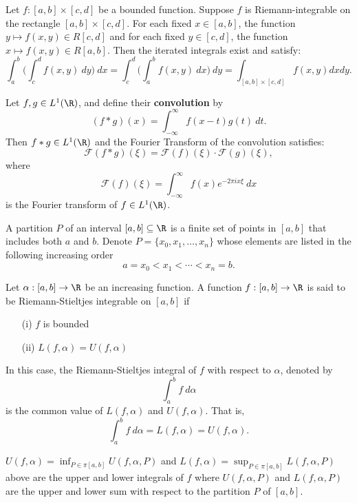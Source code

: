 \begin{theorem}\label{Fubini's Theorem}
    Let \( f: [a,b] \times [c,d]  \) be a bounded function. Suppose \( f  \) is Riemann-integrable on the rectangle \( [a,b] \times [c,d] \). For each fixed \( x \in [a,b]  \), the function \( y \mapsto f(x,y) \in R[c,d] \) and for each fixed \( y \in [c,d] \), the function \( x \mapsto f(x,y) \in R[a,b] \). Then the iterated integrals exist and satisfy: 
    \[  \int_{ a }^{ b }  \Big(  \int_{ c }^{ d }  f(x,y) \ dy  \Big) \ dx = \int_{ c }^{ d } \Big(  \int_{ a }^{ b }  f(x,y) \ dx   \Big) \ dy = \int_{ [a,b] \times [c,d] } f(x,y) dx dy. \]
\end{theorem}

\begin{theorem}\label{Convolution Theorem}
   Let \( f,g \in L^{1}(\R) \), and define their \textbf{convolution} by 
   \[  (f * g)(x) = \int_{ - \infty  }^{  \infty  }  f(x- t)g(t) \ dt.  \]
   Then \( f * g \in L^{1}(\R) \) and the Fourier Transform of the convolution satisfies:
   \[  \mathcal{F}(f * g)(\xi) = \mathcal{F}(f)(\xi) \cdot \mathcal{F}(g)(\xi), \]
   where
   \[  \mathcal{F}(f)(\xi) = \int_{ - \infty  }^{ \infty   }  f(x) e^{-2 \pi i x \xi } \ dx  \]
   is the Fourier transform of \( f \in L^{1}(\R) \).
\end{theorem}


\begin{definition}[Partition]
    A partition \( P \) of an interval \( [a,b] \subseteq \R  \) is a finite set of points in \( [a,b] \) that includes both \( a \) and \( b  \). Denote \( P = \{ {x}_{0}, {x}_{1}, \dots, {x}_{n}  \}  \) whose elements are listed in the following increasing order
    \[  a =  {x}_{0} < {x}_{1} < \cdots < {x}_{n} = b.   \]
\end{definition}


\begin{definition}
    Let \( \alpha: [a,b] \to \R  \) be an increasing function. A function \( f:[a,b] \to \R  \) is said to be Riemann-Stieltjes integrable on \( [a,b] \) if 
    \begin{enumerate}
        \item[(i)] \( f \) is bounded
        \item[(ii)] \( L(f,\alpha) = U(f,\alpha) \)
    \end{enumerate}
    In this case, the Riemann-Stieltjes integral of \( f  \) with respect to \( \alpha \), denoted by
    \[  \int_{ a }^{ b }  f \ d \alpha \]
    is the common value of \( L(f,\alpha) \) and \( U(f,\alpha) \). That is,
    \[ \int_{ a }^{ b }  f  \ d \alpha = L(f,\alpha) = U(f,\alpha). \]
\end{definition}

\begin{remark}
    \( U(f,\alpha) = \inf_{P \in \pi [a,b]} U(f,\alpha, P) \) and \( L(f,\alpha) = \sup_{P \in \pi [a,b]} L(f, \alpha , P) \) above are the upper and lower integrals of \( f  \) where \( U(f,\alpha, P) \) and \( L(f,\alpha, P) \) are the upper and lower sum with respect to the partition \( P  \) of \( [a,b] \). 
\end{remark}
